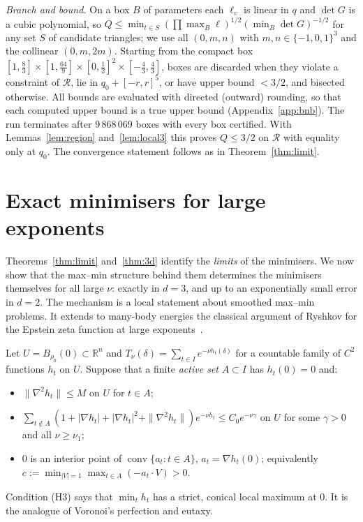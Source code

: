 \documentclass[10pt,twocolumn,a4paper]{article}
\theoremstyle{definition}
\newcommand{\R}{\mathbb{R}}
\begin{document}
\noindent\emph{Branch and bound.} On a box $B$ of parameters each $\ell_v$ is linear in $q$ and $\det G$ is a cubic polynomial, so
$Q\le\min_{t\in S}(\prod\max_B\ell)^{1/2}(\min_B\det G)^{-1/2}$ for any set $S$ of candidate triangles; we use all $(0,m,n)$ with $m,n\in\{-1,0,1\}^3$ and the collinear $(0,m,2m)$. Starting from the compact box $[1,\frac83]\times[1,\frac{64}{9}]\times[0,\frac12]^2\times[-\frac43,\frac43]$, boxes are discarded when they violate a constraint of $\mathcal R$, lie in $q_0+[-r,r]^5$, or have upper bound $<3/2$, and bisected otherwise. All bounds are evaluated with directed (outward) rounding, so that each computed upper bound is a true upper bound (Appendix~\ref{app:bnb}). The run terminates after $9\,868\,069$ boxes with every box certified. With Lemmas~\ref{lem:region} and~\ref{lem:local3} this proves $Q\le3/2$ on $\mathcal R$ with equality only at $q_0$. The convergence statement follows as in Theorem~\ref{thm:limit}.

\section{Exact minimisers for large exponents}\label{sec:exact}
Theorems~\ref{thm:limit} and~\ref{thm:3d} identify the \emph{limits} of the minimisers. We now show that the max--min structure behind them determines the minimisers themselves for all large $\nu$: exactly in $d=3$, and up to an exponentially small error in $d=2$. The mechanism is a local statement about smoothed max--min problems. It extends to many-body energies the classical argument of Ryshkov for the Epstein zeta function at large exponents~\cite{Ryshkov}.

Let $U=B_{\rho_0}(0)\subset\R^n$ and $T_\nu(\delta)=\sum_{t\in I}e^{-\nu h_t(\delta)}$ for a countable family of $C^2$ functions $h_t$ on $U$. Suppose that a finite \emph{active set} $A\subset I$ has $h_t(0)=0$ and:
\begin{itemize}\setlength\itemsep{1pt}
\item[(H1)] $\|\nabla^2h_t\|\le M$ on $U$ for $t\in A$;
\item[(H2)] $\sum_{t\notin A}(1+|\nabla h_t|+|\nabla h_t|^2+\|\nabla^2h_t\|)e^{-\nu h_t}\le C_0e^{-\nu\gamma}$ on $U$ for some $\gamma>0$ and all $\nu\ge\nu_1$;
\item[(H3)] $0$ is an interior point of $\operatorname{conv}\{a_t:t\in A\}$, $a_t=\nabla h_t(0)$; equivalently $c:=\min_{|V|=1}\max_{t\in A}(-a_t\cdot V)>0$.
\end{itemize}
Condition (H3) says that $\min_th_t$ has a strict, conical local maximum at $0$. It is the analogue of Voronoi's perfection and eutaxy.
\end{document}
